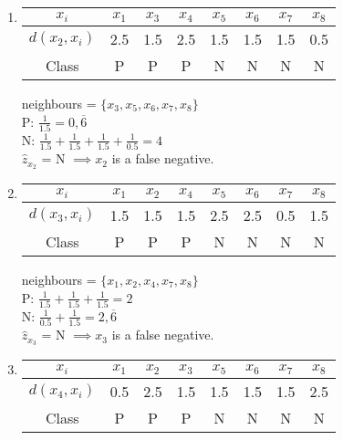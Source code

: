 \documentclass[12pt,a4paper]{article}
\newcommand{\subscript}[2]{$#1 _ #2$}
\begin{document}
\begin{enumerate}
\begin{enumerate}[label=\subscript{x}{{\arabic*}})]
		      \item
		            \begin{tabular}[t]{|c|c|c|c|c|c|c|c|}
			            \hline
			            $x_i$         & $x_1$ & $x_3$ & $x_4$ & $x_5$ & $x_6$ & $x_7$ & $x_8$ \\
			            \hline
			            $d(x_2, x_i)$ & 2.5   & 1.5   & 2.5   & 1.5   & 1.5   & 1.5   & 0.5   \\
			            \hline
			            Class         & P     & P     & P     & N     & N     & N     & N     \\
			            \hline
		            \end{tabular}

		            \vspace{5px}

		            neighbours = $\{x_3, x_5, x_6, x_7, x_8\}$ \\
		            P: $\frac{1}{1.5} = 0,\overline{6}$ \\
		            N: $\frac{1}{1.5} + \frac{1}{1.5} + \frac{1}{1.5} + \frac{1}{0.5} = 4$ \\
		            $\hat{z}_{x_2}$ = N $\implies x_2$ is a false negative.

		      \item
		            \begin{tabular}[t]{|c|c|c|c|c|c|c|c|}
			            \hline
			            $x_i$         & $x_1$ & $x_2$ & $x_4$ & $x_5$ & $x_6$ & $x_7$ & $x_8$ \\
			            \hline
			            $d(x_3, x_i)$ & 1.5   & 1.5   & 1.5   & 2.5   & 2.5   & 0.5   & 1.5   \\
			            \hline
			            Class         & P     & P     & P     & N     & N     & N     & N     \\
			            \hline
		            \end{tabular}

		            \vspace{5px}

		            neighbours = $\{x_1, x_2, x_4, x_7, x_8\}$ \\
		            P: $\frac{1}{1.5} + \frac{1}{1.5} + \frac{1}{1.5} = 2$ \\
		            N: $\frac{1}{0.5} + \frac{1}{1.5} = 2,\overline{6}$ \\
		            $\hat{z}_{x_3}$ = N $\implies x_3$ is a false negative.

		      \item
		            \begin{tabular}[t]{|c|c|c|c|c|c|c|c|}
			            \hline
			            $x_i$         & $x_1$ & $x_2$ & $x_3$ & $x_5$ & $x_6$ & $x_7$ & $x_8$ \\
			            \hline
			            $d(x_4, x_i)$ & 0.5   & 2.5   & 1.5   & 1.5   & 1.5   & 1.5   & 2.5   \\
			            \hline
			            Class         & P     & P     & P     & N     & N     & N     & N     \\
			            \hline
		            \end{tabular}


\end{enumerate}
\end{enumerate}
\end{document}

